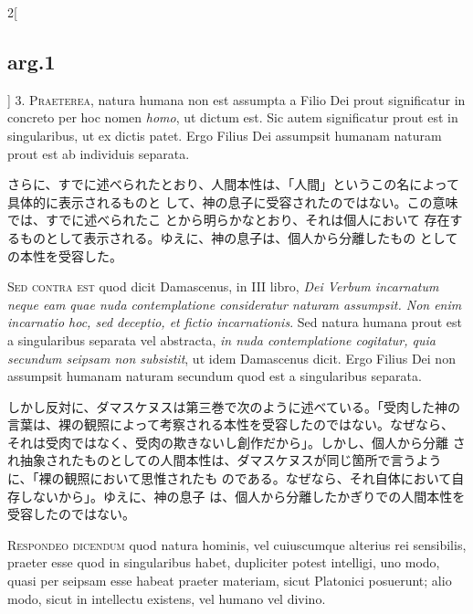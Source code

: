 \documentclass[paper=a4paper,fontsize=10pt,jafontsize=9pt,titlepage]{jlreq}
\begin{document}
\begin{paracol}{2}[\subsection{arg.1}]
3. {\scshape Praeterea}, natura humana non est assumpta a Filio Dei prout significatur
in concreto per hoc nomen {\itshape homo}, ut dictum est. Sic autem significatur
prout est in singularibus, ut ex dictis patet. Ergo Filius Dei assumpsit
humanam naturam prout est ab individuis separata.

\switchcolumn

さらに、すでに述べられたとおり、人間本性は、「人間」というこの名によって具体的に表示されるものと
 して、神の息子に受容されたのではない。この意味では、すでに述べられたこ
 とから明らかなとおり、それは個人において
 存在するものとして表示される。ゆえに、神の息子は、個人から分離したもの
 としての本性を受容した。

\switchcolumn*[\subsection{s.c.}]

{\scshape Sed contra est} quod dicit Damascenus, in III libro, {\itshape Dei Verbum
incarnatum neque eam quae nuda contemplatione consideratur naturam
assumpsit. Non enim incarnatio hoc, sed deceptio, et fictio
incarnationis}. Sed natura humana prout est a singularibus separata vel
abstracta, {\itshape in nuda contemplatione cogitatur, quia secundum seipsam non
subsistit}, ut idem Damascenus dicit. Ergo Filius Dei non assumpsit
humanam naturam secundum quod est a singularibus separata.

\switchcolumn

しかし反対に、ダマスケヌスは第三巻で次のように述べている。「受肉した神の
 言葉は、裸の観照によって考察される本性を受容したのではない。なぜなら、
 それは受肉ではなく、受肉の欺きないし創作だから」。しかし、個人から分離
 され抽象されたものとしての人間本性は、ダマスケヌスが同じ箇所で言うよう
 に、「裸の観照において思惟されたも
 のである。なぜなら、それ自体において自存しないから」。ゆえに、神の息子
 は、個人から分離したかぎりでの人間本性を受容したのではない。


{\scshape Respondeo dicendum} quod natura hominis, vel cuiuscumque alterius rei
sensibilis, praeter esse quod in singularibus habet, dupliciter potest
intelligi, uno modo, quasi per seipsam esse habeat praeter materiam,
sicut Platonici posuerunt; alio modo, sicut in intellectu existens, vel
humano vel divino.


\end{paracol}
\end{document}
